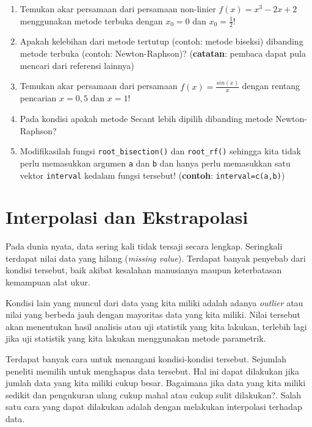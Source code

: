 \documentclass[
]{book}
\providecommand{\tightlist}{%
  \setlength{\itemsep}{0pt}\setlength{\parskip}{0pt}}
\theoremstyle{definition}
\theoremstyle{definition}
\theoremstyle{definition}
\theoremstyle{definition}
\theoremstyle{remark}
\begin{document}
\begin{enumerate}
\def\labelenumi{\arabic{enumi}.}
\tightlist
\item
  Temukan akar persamaan dari persamaan non-linier \(f\left(x\right)=x^3-2x+2\) menggunakan metode terbuka dengan \(x_0=0\) dan \(x_0=\frac{1}{2}\)!
\item
  Apakah kelebihan dari metode tertutup (contoh: metode biseksi) dibanding metode terbuka (contoh: Newton-Raphson)? (\textbf{catatan}: pembaca dapat pula mencari dari referensi lainnya)
\item
  Temukan akar persamaan dari persamaan \(f\left(x\right)=\frac{sin\left(x\right)}{x}\) dengan rentang pencarian \(x=0,5\) dan \(x=1\)!
\item
  Pada kondisi apakah metode Secant lebih dipilih dibanding metode Newton-Raphson?
\item
  Modifikasilah fungsi \texttt{root\_bisection()} dan \texttt{root\_rf()} sehingga kita tidak perlu memasukkan argumen \texttt{a} dan \texttt{b} dan hanya perlu memasukkan satu vektor \texttt{interval} kedalam fungsi tersebut! (\textbf{contoh}: \texttt{interval=c(a,b)})
\end{enumerate}

\hypertarget{interpolation}{%
\chapter{Interpolasi dan Ekstrapolasi}\label{interpolation}}

Pada dunia nyata, data sering kali tidak tersaji secara lengkap. Seringkali terdapat nilai data yang hilang (\emph{missing value}). Terdapat banyak penyebab dari kondisi tersebut, baik akibat kesalahan manusianya maupun keterbatasan kemampuan alat ukur.

Kondisi lain yang muncul dari data yang kita miliki adalah adanya \emph{outlier} atau nilai yang berbeda jauh dengan mayoritas data yang kita miliki. Nilai tersebut akan menentukan hasil analisis atau uji statistik yang kita lakukan, terlebih lagi jika uji statistik yang kita lakukan menggunakan metode parametrik.

Terdapat banyak cara untuk menangani kondisi-kondisi tersebut. Sejumlah peneliti memilih untuk menghapus data tersebut. Hal ini dapat dilakukan jika jumlah data yang kita miliki cukup besar. Bagaimana jika data yang kita miliki sedikit dan pengukuran ulang cukup mahal atau cukup sulit dilakukan?. Salah satu cara yang dapat dilakukan adalah dengan melakukan interpolasi terhadap data.
\end{document}

